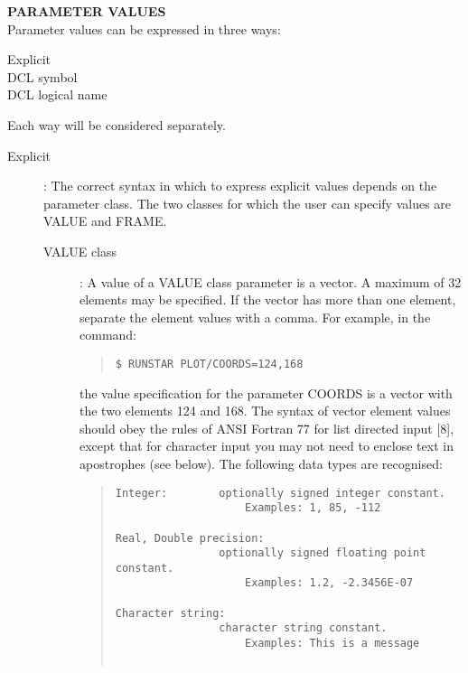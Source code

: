\vspace{5mm}
{\bf PARAMETER VALUES}\\
Parameter values can be expressed in three ways:
\begin{description}
\begin{description}
\item [Explicit]
\item [DCL symbol]
\item [DCL logical name]
\end{description}
\end{description}
Each way will be considered separately.
\begin{description}
\item [Explicit]:
The correct syntax in which to express explicit values depends on the parameter
class.
The two classes for which the user can specify values are VALUE and FRAME.
\begin{description}
\item [VALUE class]:
A value of a VALUE class parameter is a vector.
A maximum of 32 elements may be specified.
If the vector has more than one element, separate the element values with a
comma.
For example, in the command:
\begin{quote}
{\tt \$ RUNSTAR PLOT/COORDS=124,168}
\end{quote}
the value specification for the parameter COORDS is a vector with the two
elements 124 and 168.
The syntax of vector element values should obey the rules of ANSI Fortran 77 for
list directed input [8], except that for character input you may not need to
enclose text in apostrophes (see below).
The following data types are recognised:
\begin{quote}
\begin{verbatim}
Integer:        optionally signed integer constant.
                    Examples: 1, 85, -112

Real, Double precision:
                optionally signed floating point constant.
                    Examples: 1.2, -2.3456E-07

Character string:
                character string constant.
                    Examples: This is a message


\end{verbatim}
\end{quote}
\end{description}
\end{description}
